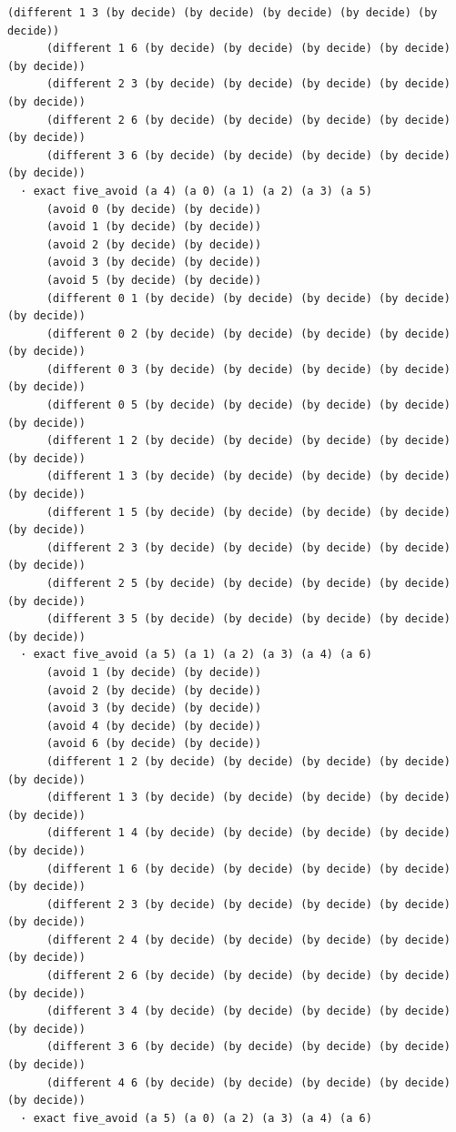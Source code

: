 \documentclass[11pt,a4paper]{article}
\begin{document}
\begin{Verbatim}[breaklines,breakanywhere,fontsize=\footnotesize]
      (different 1 3 (by decide) (by decide) (by decide) (by decide) (by decide))
      (different 1 6 (by decide) (by decide) (by decide) (by decide) (by decide))
      (different 2 3 (by decide) (by decide) (by decide) (by decide) (by decide))
      (different 2 6 (by decide) (by decide) (by decide) (by decide) (by decide))
      (different 3 6 (by decide) (by decide) (by decide) (by decide) (by decide))
  · exact five_avoid (a 4) (a 0) (a 1) (a 2) (a 3) (a 5)
      (avoid 0 (by decide) (by decide))
      (avoid 1 (by decide) (by decide))
      (avoid 2 (by decide) (by decide))
      (avoid 3 (by decide) (by decide))
      (avoid 5 (by decide) (by decide))
      (different 0 1 (by decide) (by decide) (by decide) (by decide) (by decide))
      (different 0 2 (by decide) (by decide) (by decide) (by decide) (by decide))
      (different 0 3 (by decide) (by decide) (by decide) (by decide) (by decide))
      (different 0 5 (by decide) (by decide) (by decide) (by decide) (by decide))
      (different 1 2 (by decide) (by decide) (by decide) (by decide) (by decide))
      (different 1 3 (by decide) (by decide) (by decide) (by decide) (by decide))
      (different 1 5 (by decide) (by decide) (by decide) (by decide) (by decide))
      (different 2 3 (by decide) (by decide) (by decide) (by decide) (by decide))
      (different 2 5 (by decide) (by decide) (by decide) (by decide) (by decide))
      (different 3 5 (by decide) (by decide) (by decide) (by decide) (by decide))
  · exact five_avoid (a 5) (a 1) (a 2) (a 3) (a 4) (a 6)
      (avoid 1 (by decide) (by decide))
      (avoid 2 (by decide) (by decide))
      (avoid 3 (by decide) (by decide))
      (avoid 4 (by decide) (by decide))
      (avoid 6 (by decide) (by decide))
      (different 1 2 (by decide) (by decide) (by decide) (by decide) (by decide))
      (different 1 3 (by decide) (by decide) (by decide) (by decide) (by decide))
      (different 1 4 (by decide) (by decide) (by decide) (by decide) (by decide))
      (different 1 6 (by decide) (by decide) (by decide) (by decide) (by decide))
      (different 2 3 (by decide) (by decide) (by decide) (by decide) (by decide))
      (different 2 4 (by decide) (by decide) (by decide) (by decide) (by decide))
      (different 2 6 (by decide) (by decide) (by decide) (by decide) (by decide))
      (different 3 4 (by decide) (by decide) (by decide) (by decide) (by decide))
      (different 3 6 (by decide) (by decide) (by decide) (by decide) (by decide))
      (different 4 6 (by decide) (by decide) (by decide) (by decide) (by decide))
  · exact five_avoid (a 5) (a 0) (a 2) (a 3) (a 4) (a 6)

\end{Verbatim}
\end{document}
